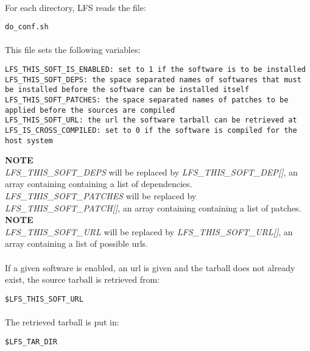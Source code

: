 \documentclass[a4paper, 11pt]{article}
\begin{document}
\paragraph{}
For each directory, LFS reads the file:\\

\begin{lstlisting}[frame=tb]
do_conf.sh
\end{lstlisting}

\paragraph{}
This file sets the following variables:\\

\begin{lstlisting}[frame=tb]
LFS_THIS_SOFT_IS_ENABLED: set to 1 if the software is to be installed
LFS_THIS_SOFT_DEPS: the space separated names of softwares that must
be installed before the software can be installed itself
LFS_THIS_SOFT_PATCHES: the space separated names of patches to be
applied before the sources are compiled
LFS_THIS_SOFT_URL: the url the software tarball can be retrieved at
LFS_IS_CROSS_COMPILED: set to 0 if the software is compiled for the
host system
\end{lstlisting}
\textbf{NOTE}\\
\textit{LFS\_THIS\_SOFT\_DEPS} will be replaced by
\textit{LFS\_THIS\_SOFT\_DEP[]}, an array containing containing a list of
dependencies.\\
\textit{LFS\_THIS\_SOFT\_PATCHES} will be replaced by
\textit{LFS\_THIS\_SOFT\_PATCH[]}, an array containing containing a list of
patches.\\
\textbf{NOTE}\\
\textit{LFS\_THIS\_SOFT\_URL} will be replaced by
\textit{LFS\_THIS\_SOFT\_URL[]}, an array containing a list of possible urls.

\paragraph{}
If a given software is enabled, an url is given and the tarball does not already
exist, the source tarball is retrieved from:\\

\begin{lstlisting}[frame=tb]
$LFS_THIS_SOFT_URL
\end{lstlisting}

\paragraph{}
The retrieved tarball is put in:\\
\begin{lstlisting}[frame=tb]
$LFS_TAR_DIR
\end{lstlisting}
\end{document}
